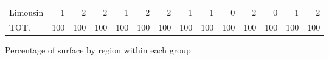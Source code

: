 \documentclass[11pt]{article}
\begin{document}
\begin{table}[H]
\begin{tabular}{lrrrrrrrrrrrrr}
Limousin             &          1 &          2 &          2 &          1 &          2 &          2 &          1 &          1 &          0 &          2 &          0 &          1 &          2 \\
TOT.                 &        100 &        100 &        100 &        100 &        100 &        100 &        100 &        100 &        100 &        100 &        100 &        100 &        100 \\
\bottomrule
\end{tabular}

\end{table}

\begin{table}[H]
\caption{Percentage of surface by region within each group}
\footnotesize
\setlength{\tabcolsep}{2pt}


\end{table}
\end{document}
